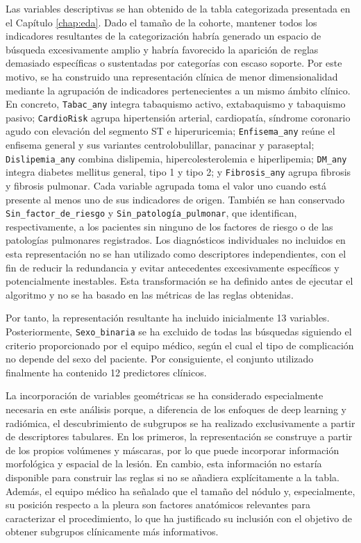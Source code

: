 Las variables descriptivas se han obtenido de la tabla categorizada presentada en el Capítulo \ref{chap:eda}. Dado el tamaño de la cohorte, mantener todos los indicadores resultantes de la categorización habría generado un espacio de búsqueda excesivamente amplio y habría favorecido la aparición de reglas demasiado específicas o sustentadas por categorías con escaso soporte. Por este motivo, se ha construido una representación clínica de menor dimensionalidad mediante la agrupación de indicadores pertenecientes a un mismo ámbito clínico. En concreto, \texttt{Tabac\_any} integra tabaquismo activo, extabaquismo y tabaquismo pasivo; \texttt{CardioRisk} agrupa hipertensión arterial, cardiopatía, síndrome coronario agudo con elevación del segmento ST e hiperuricemia; \texttt{Enfisema\_any} reúne el enfisema general y sus variantes centrolobulillar, panacinar y paraseptal; \texttt{Dislipemia\_any} combina dislipemia, hipercolesterolemia e hiperlipemia; \texttt{DM\_any} integra diabetes mellitus general, tipo 1 y tipo 2; y \texttt{Fibrosis\_any} agrupa fibrosis y fibrosis pulmonar. Cada variable agrupada toma el valor uno cuando está presente al menos uno de sus indicadores de origen. También se han conservado \texttt{Sin\_factor\_de\_riesgo} y \texttt{Sin\_patología\_pulmonar}, que identifican, respectivamente, a los pacientes sin ninguno de los factores de riesgo o de las patologías pulmonares registrados. Los diagnósticos individuales no incluidos en esta representación no se han utilizado como descriptores independientes, con el fin de reducir la redundancia y evitar antecedentes excesivamente específicos y potencialmente inestables. Esta transformación se ha definido antes de ejecutar el algoritmo y no se ha basado en las métricas de las reglas obtenidas.

Por tanto, la representación resultante ha incluido inicialmente 13 variables. Posteriormente, \texttt{Sexo\_binaria} se ha excluido de todas las búsquedas siguiendo el criterio proporcionado por el equipo médico, según el cual el tipo de complicación no depende del sexo del paciente. Por consiguiente, el conjunto utilizado finalmente ha contenido 12 predictores clínicos.

La incorporación de variables geométricas se ha considerado especialmente necesaria en este análisis porque, a diferencia de los enfoques de deep learning y radiómica, el descubrimiento de subgrupos se ha realizado exclusivamente a partir de descriptores tabulares. En los primeros, la representación se construye a partir de los propios volúmenes y máscaras, por lo que puede incorporar información morfológica y espacial de la lesión. En cambio, esta información no estaría disponible para construir las reglas si no se añadiera explícitamente a la tabla. Además, el equipo médico ha señalado que el tamaño del nódulo y, especialmente, su posición respecto a la pleura son factores anatómicos relevantes para caracterizar el procedimiento, lo que ha justificado su inclusión con el objetivo de obtener subgrupos clínicamente más informativos.

